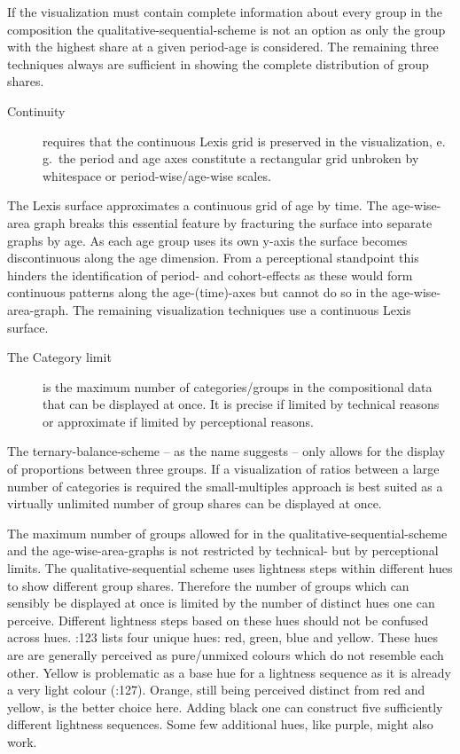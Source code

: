 \documentclass[a4paper, 12pt]{scrartcl}
\begin{document}
If the visualization must contain complete information about every group in the composition the qualitative-sequential-scheme is not an option as only the group with the highest share at a given period-age is considered. The remaining three techniques always are sufficient in showing the complete distribution of group shares.

\begin{description}
  \item[Continuity] requires that the continuous Lexis grid is preserved in the visualization, e.\,g.~the period and age axes constitute a rectangular grid unbroken by whitespace or period-wise/age-wise scales.
\end{description}

The Lexis surface approximates a continuous grid of age by time. The age-wise-area graph breaks this essential feature by fracturing the surface into separate graphs by age. As each age group uses its own y-axis the surface becomes discontinuous along the age dimension. From a perceptional standpoint this hinders the identification of period- and cohort-effects as these would form continuous patterns along the age-(time)-axes but cannot do so in the age-wise-area-graph. The remaining visualization techniques use a continuous Lexis surface.

\begin{description}
  \item[The Category limit] is the maximum number of categories/groups in the compositional data that can be displayed at once. It is precise if limited by technical reasons or approximate if limited by perceptional reasons.
\end{description}

The ternary-balance-scheme -- as the name suggests -- only allows for the display of proportions between three groups. If a visualization of ratios between a large number of categories is required the small-multiples approach is best suited as a virtually unlimited number of group shares can be displayed at once.

The maximum number of groups allowed for in the qualitative-sequential-scheme and the age-wise-area-graphs is not restricted by technical- but by perceptional limits. The qualitative-sequential scheme uses lightness steps within different hues to show different group shares. Therefore the number of groups which can sensibly be displayed at once is limited by the number of distinct hues one can perceive. Different lightness steps based on these hues should not be confused across hues. \textcite{Ware2013}:123 lists four unique hues: red, green, blue and yellow. These hues are are generally perceived as pure/unmixed colours which do not resemble each other. Yellow is problematic as a base hue for a lightness sequence as it is already a very light colour (\cite{Ware2013}:127). Orange, still being perceived distinct from red and yellow, is the better choice here. Adding black one can construct five sufficiently different lightness sequences. Some few additional hues, like purple, might also work.
\end{document}

